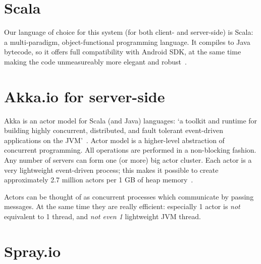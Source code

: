 %
%
%
%
%

\section{Scala}
\label{sec:scala}

Our language of choice for this system (for both client- and server-side) is Scala: a multi-paradigm, object-functional programming language. It compiles to Java bytecode, so it offers full compatibility with Android SDK, at the same time making the code unmeasureably more elegant and robust~\cite{Odersky:2008:Programming}.

\section{Akka.io for server-side}
\label{sec:akka}

Akka is an actor model for Scala (and Java) languages: `a toolkit and runtime for building highly concurrent, distributed, and fault tolerant event-driven applications on the JVM'~\cite{Akka:2013:Docs}. Actor model is a higher-level abstraction of concurrent programming. All operations are performed in a non-blocking fashion. Any number of servers can form one (or more) big actor cluster. Each actor is a very lightweight event-driven process; this makes it possible to create approximately 2.7 million actors per 1 GB of heap memory~\cite{Akka:2013:Docs}.

Actors can be thought of as concurrent processes which communicate by passing messages. At the same time they are really efficient: especially 1 actor is \emph{not} equivalent to 1 thread, and \emph{not even 1} lightweight JVM thread.

\section{Spray.io}
\label{sec:theory-spray}

